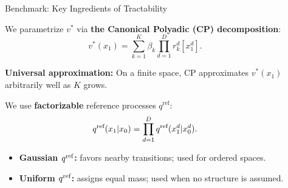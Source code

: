 \documentclass[final]{beamer}
\newlength{\sepwidth}
\newlength{\colwidth}
\newcommand{\separatorcolumn}{\begin{column}{\sepwidth}\end{column}}
\begin{document}
\begin{frame}[t]
\begin{columns}[t]
\begin{column}{\colwidth}
    \begin{block}{Benchmark: Key Ingredients of Tractability}
        \begin{minipage}[t]{0.48\linewidth}
            We parametrize $v^*$ via \textbf{the Canonical Polyadic (CP) decomposition}:
            \begin{equation*}
                v^{*}(x_1)=\sum_{k=1}^{K}\beta_k\prod_{d=1}^{D} r_k^d[x_1^d].
            \end{equation*}
    
            \textbf{\color{Green}Universal approximation:} On a finite space, CP approximates $v^*(x_1)$ arbitrarily well as $K$ grows.
    
        \end{minipage}
        \hfill
        \vrule
        \hfill
        \begin{minipage}[t]{0.48\linewidth}
            We use \textbf{factorizable} reference processes $q^{\text{ref}}$:
            \begin{equation*}
                q^{\textup{ref}}(x_1 | x_0)=\prod_{d=1}^D q^{\textup{ref}}(x_1^d | x_0^d).
            \end{equation*} 
    
            \vspace{-4mm}
            
            \begin{itemize}\setlength{\itemindent}{0pt}
                \item \textbf{Gaussian $q^{\textup{ref}}$:} favors nearby transitions; used for ordered spaces.
                \item \textbf{Uniform $q^{\textup{ref}}$:} assigns equal mass; used when no structure is assumed.
            \end{itemize}

        \end{minipage}
    \end{block}
\end{column}

\separatorcolumn

\begin{column}{\colwidth}


\end{column}
\end{columns}
\end{frame}
\end{document}
